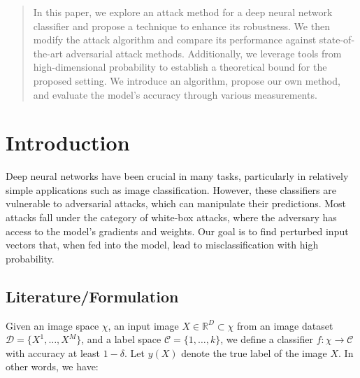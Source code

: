 \documentclass{article}
\theoremstyle{plain}
\theoremstyle{definition}
\theoremstyle{remark}
\begin{document}


\begin{abstract}
In this paper, we explore an attack method for a deep neural network classifier and propose a technique to enhance its robustness. We then modify the attack algorithm and compare its performance against state-of-the-art adversarial attack methods. Additionally, we leverage tools from high-dimensional probability to establish a theoretical bound for the proposed setting. We introduce an algorithm, propose our own method, and evaluate the model’s accuracy through various measurements.
\end{abstract}

\section{Introduction}

Deep neural networks have been crucial in many tasks, particularly in relatively simple applications such as image classification. However, these classifiers are vulnerable to adversarial attacks, which can manipulate their predictions. Most attacks fall under the category of white-box attacks, where the adversary has access to the model’s gradients and weights. Our goal is to find perturbed input vectors that, when fed into the model, lead to misclassification with high probability.


\subsection{Literature/Formulation}
Given an image space \( \chi \), an input image \( X \in \mathbb{R}^D \subset \chi \) from an image dataset \( \mathcal{D} = \{X^1, \dots, X^M\} \), and a label space \( \mathcal{C} =\{1,\dots, k\} \), we define a classifier \( f: \chi \to \mathcal{C} \) with accuracy at least \( 1-\delta \). Let \( y(X) \) denote the true label of the image \( X \). In other words, we have:
\end{document}
